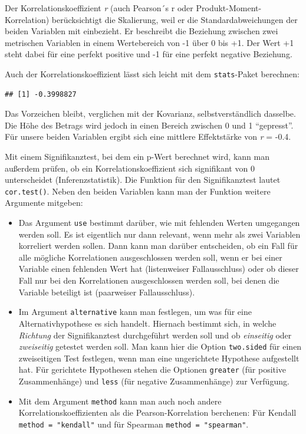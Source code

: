 \documentclass[
]{book}
\newenvironment{Shaded}{\begin{snugshade}}{\end{snugshade}}
\newcommand{\FunctionTok}[1]{\textcolor[rgb]{0.00,0.00,0.00}{#1}}
\newcommand{\NormalTok}[1]{#1}
\newcommand{\SpecialCharTok}[1]{\textcolor[rgb]{0.00,0.00,0.00}{#1}}
\begin{document}
Der Korrelationskoeffizient \emph{r} (auch Pearson´s r oder Produkt-Moment-Korrelation) berücksichtigt die Skalierung, weil er die Standardabweichungen der beiden Variablen mit einbezieht. Er beschreibt die Beziehung zwischen zwei metrischen Variablen in einem Wertebereich von -1 über 0 bis +1. Der Wert +1 steht dabei für eine perfekt positive und -1 für eine perfekt negative Beziehung.

Auch der Korrelationskoeffizient lässt sich leicht mit dem \texttt{stats}-Paket berechnen:

\begin{Shaded}
\end{Shaded}

\begin{verbatim}
## [1] -0.3998827
\end{verbatim}

Das Vorzeichen bleibt, verglichen mit der Kovarianz, selbstverständlich dasselbe. Die Höhe des Betrags wird jedoch in einen Bereich zwischen 0 und 1 ``gepresst''. Für unsere beiden Variablen ergibt sich eine mittlere Effektstärke von \emph{r} = -0.4.

Mit einem Signifikanztest, bei dem ein p-Wert berechnet wird, kann man außerdem prüfen, ob ein Korrelationskoeffizient sich signifikant von 0 unterscheidet (Inferenzstatistik). Die Funktion für den Signifikanztest lautet \texttt{cor.test()}. Neben den beiden Variablen kann man der Funktion weitere Argumente mitgeben:

\begin{itemize}
\item
  Das Argument \texttt{use} bestimmt darüber, wie mit fehlenden Werten umgegangen werden soll. Es ist eigentlich nur dann relevant, wenn mehr als zwei Variablen korreliert werden sollen. Dann kann man darüber entscheiden, ob ein Fall für alle mögliche Korrelationen ausgeschlossen werden soll, wenn er bei einer Variable einen fehlenden Wert hat (listenweiser Fallausschluss) oder ob dieser Fall nur bei den Korrelationen ausgeschlossen werden soll, bei denen die Variable beteiligt ist (paarweiser Fallausschluss).
\item
  Im Argument \texttt{alternative} kann man festlegen, um was für eine Alternativhypothese es sich handelt. Hiernach bestimmt sich, in welche \emph{Richtung} der Signifikanztest durchgeführt werden soll und ob \emph{einseitig} oder \emph{zweiseitig} getestet werden soll. Man kann hier die Option \texttt{two.sided} für einen zweiseitigen Test festlegen, wenn man eine ungerichtete Hypothese aufgestellt hat. Für gerichtete Hypothesen stehen die Optionen \texttt{greater} (für positive Zusammenhänge) und \texttt{less} (für negative Zusammenhänge) zur Verfügung.
\item
  Mit dem Argument \texttt{method} kann man auch noch andere Korrelationskoeffizienten als die Pearson-Korrelation berchenen: Für Kendall \texttt{method\ =\ "kendall"} und für Spearman \texttt{method\ =\ "spearman"}.
\end{itemize}
\end{document}
